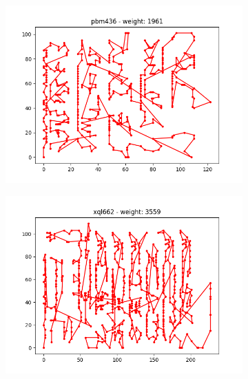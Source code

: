 \documentclass{article}
\def\v{0.4}
\begin{document}
\begin{figure}[h!]
\begin{subfigure}[b]{\v\linewidth}
		\includegraphics[width=\linewidth]{graphs/TSP_pbm436.png}
	\end{subfigure}
	\begin{subfigure}[b]{\v\linewidth}
		\includegraphics[width=\linewidth]{graphs/TSP_xql662.png}
	\end{subfigure}
\end{figure}
\end{document}
